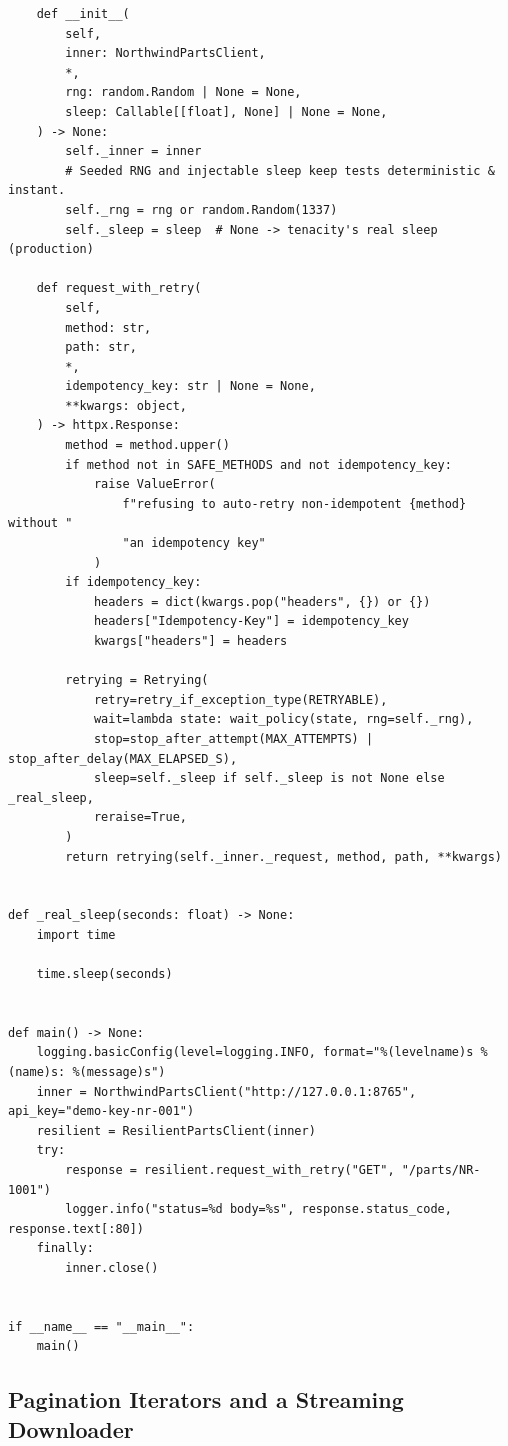 \begin{verbatim}
    def __init__(
        self,
        inner: NorthwindPartsClient,
        *,
        rng: random.Random | None = None,
        sleep: Callable[[float], None] | None = None,
    ) -> None:
        self._inner = inner
        # Seeded RNG and injectable sleep keep tests deterministic & instant.
        self._rng = rng or random.Random(1337)
        self._sleep = sleep  # None -> tenacity's real sleep (production)

    def request_with_retry(
        self,
        method: str,
        path: str,
        *,
        idempotency_key: str | None = None,
        **kwargs: object,
    ) -> httpx.Response:
        method = method.upper()
        if method not in SAFE_METHODS and not idempotency_key:
            raise ValueError(
                f"refusing to auto-retry non-idempotent {method} without "
                "an idempotency key"
            )
        if idempotency_key:
            headers = dict(kwargs.pop("headers", {}) or {})
            headers["Idempotency-Key"] = idempotency_key
            kwargs["headers"] = headers

        retrying = Retrying(
            retry=retry_if_exception_type(RETRYABLE),
            wait=lambda state: wait_policy(state, rng=self._rng),
            stop=stop_after_attempt(MAX_ATTEMPTS) | stop_after_delay(MAX_ELAPSED_S),
            sleep=self._sleep if self._sleep is not None else _real_sleep,
            reraise=True,
        )
        return retrying(self._inner._request, method, path, **kwargs)


def _real_sleep(seconds: float) -> None:
    import time

    time.sleep(seconds)


def main() -> None:
    logging.basicConfig(level=logging.INFO, format="%(levelname)s %(name)s: %(message)s")
    inner = NorthwindPartsClient("http://127.0.0.1:8765", api_key="demo-key-nr-001")
    resilient = ResilientPartsClient(inner)
    try:
        response = resilient.request_with_retry("GET", "/parts/NR-1001")
        logger.info("status=%d body=%s", response.status_code, response.text[:80])
    finally:
        inner.close()


if __name__ == "__main__":
    main()
\end{verbatim}

\subsection{Pagination Iterators and a Streaming Downloader}
\label{sec:ch02-pagination-code}

